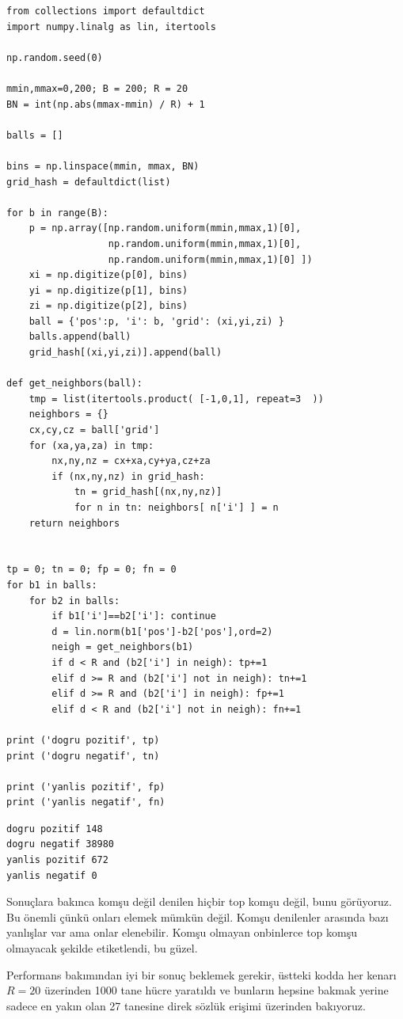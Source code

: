 \documentclass[12pt,fleqn]{article}\usepackage{../../common}
\begin{document}
\begin{verbatim}
from collections import defaultdict 
import numpy.linalg as lin, itertools

np.random.seed(0)

mmin,mmax=0,200; B = 200; R = 20
BN = int(np.abs(mmax-mmin) / R) + 1

balls = []

bins = np.linspace(mmin, mmax, BN)
grid_hash = defaultdict(list)

for b in range(B):
    p = np.array([np.random.uniform(mmin,mmax,1)[0],
                  np.random.uniform(mmin,mmax,1)[0],
                  np.random.uniform(mmin,mmax,1)[0] ])    
    xi = np.digitize(p[0], bins)
    yi = np.digitize(p[1], bins)
    zi = np.digitize(p[2], bins)
    ball = {'pos':p, 'i': b, 'grid': (xi,yi,zi) }
    balls.append(ball)
    grid_hash[(xi,yi,zi)].append(ball)

def get_neighbors(ball):
    tmp = list(itertools.product( [-1,0,1], repeat=3  ))
    neighbors = {}
    cx,cy,cz = ball['grid']
    for (xa,ya,za) in tmp:
        nx,ny,nz = cx+xa,cy+ya,cz+za
        if (nx,ny,nz) in grid_hash:
            tn = grid_hash[(nx,ny,nz)]
            for n in tn: neighbors[ n['i'] ] = n
    return neighbors


tp = 0; tn = 0; fp = 0; fn = 0
for b1 in balls:
    for b2 in balls:
        if b1['i']==b2['i']: continue
        d = lin.norm(b1['pos']-b2['pos'],ord=2)
        neigh = get_neighbors(b1)
        if d < R and (b2['i'] in neigh): tp+=1        
        elif d >= R and (b2['i'] not in neigh): tn+=1
        elif d >= R and (b2['i'] in neigh): fp+=1
        elif d < R and (b2['i'] not in neigh): fn+=1

print ('dogru pozitif', tp)
print ('dogru negatif', tn)

print ('yanlis pozitif', fp)
print ('yanlis negatif', fn)
\end{verbatim}

\begin{verbatim}
dogru pozitif 148
dogru negatif 38980
yanlis pozitif 672
yanlis negatif 0
\end{verbatim}

Sonuçlara bakınca komşu değil denilen hiçbir top komşu değil, bunu görüyoruz. Bu
önemli çünkü onları elemek mümkün değil. Komşu denilenler arasında bazı
yanlışlar var ama onlar elenebilir. Komşu olmayan onbinlerce top komşu olmayacak
şekilde etiketlendi, bu güzel.

Performans bakımından iyi bir sonuç beklemek gerekir, üstteki kodda her kenarı
$R=20$ üzerinden 1000 tane hücre yaratıldı ve bunların hepsine bakmak yerine
sadece en yakın olan 27 tanesine direk sözlük erişimi üzerinden bakıyoruz.
\end{document}
